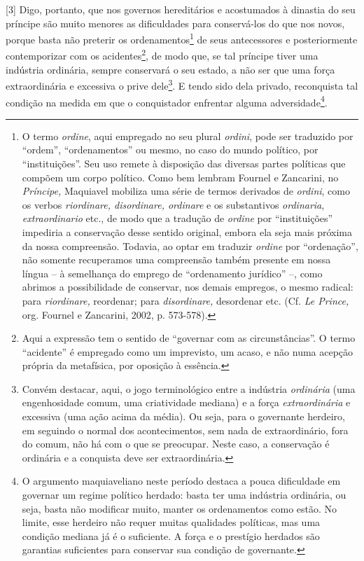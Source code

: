 {[}3{]} Digo, portanto, que nos governos hereditários e acostumados à
dinastia do seu príncipe são muito menores as dificuldades para
conservá-los do que nos novos, porque basta não preterir os
ordenamentos\footnote{O termo \emph{ordine}, aqui empregado no seu
  plural \emph{ordini}, pode ser traduzido por ``ordem'',
  ``ordenamentos'' ou mesmo, no caso do mundo político, por
  ``instituições''. Seu uso remete à disposição das diversas partes
  políticas que compõem um corpo político. Como bem lembram Fournel e
  Zancarini, no \emph{Príncipe,} Maquiavel mobiliza uma série de termos
  derivados de \emph{ordini}, como os verbos \emph{riordinare,
  disordinare, ordinare} e os substantivos \emph{ordinaria},
  \emph{extraordinario} etc., de modo que a tradução de \emph{ordine}
  por ``instituições'' impediria a conservação desse sentido original,
  embora ela seja mais próxima da nossa compreensão. Todavia, ao optar
  em traduzir \emph{ordine} por ``ordenação'', não somente recuperamos
  uma compreensão também presente em nossa língua -- à semelhança do
  emprego de ``ordenamento jurídico'' --, como abrimos a possibilidade
  de conservar, nos demais empregos, o mesmo radical: para
  \emph{riordinare,} reordenar; para \emph{disordinare,} desordenar etc.
  (Cf. \emph{Le Prince,} org. Fournel e Zancarini, 2002, p. 573-578).}
de seus antecessores e posteriormente contemporizar com os
acidentes\footnote{Aqui a expressão tem o sentido de ``governar com as
  circunstâncias''. O termo ``acidente'' é empregado como um imprevisto,
  um acaso, e não numa acepção própria da metafísica, por oposição à
  essência.}, de modo que, se tal príncipe tiver uma indústria
ordinária, sempre conservará o seu estado, a não ser que uma força
extraordinária e excessiva o prive dele\footnote{Convém destacar, aqui,
  o jogo terminológico entre a indústria \emph{ordinária} (uma
  engenhosidade comum, uma criatividade mediana) e a força
  \emph{extraordinária} e excessiva (uma ação acima da média). Ou seja,
  para o governante herdeiro, em seguindo o normal dos acontecimentos,
  sem nada de extraordinário, fora do comum, não há com o que se
  preocupar. Neste caso, a conservação é ordinária e a conquista deve
  ser extraordinária.}. E tendo sido dela privado, reconquista tal
condição na medida em que o conquistador enfrentar alguma
adversidade\footnote{O argumento maquiaveliano neste período destaca a
  pouca dificuldade em governar um regime político herdado: basta ter
  uma indústria ordinária, ou seja, basta não modificar muito, manter os
  ordenamentos como estão. No limite, esse herdeiro não requer muitas
  qualidades políticas, mas uma condição mediana já é o suficiente. A
  força e o prestígio herdados são garantias suficientes para conservar
  sua condição de governante.}.

